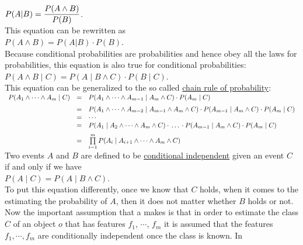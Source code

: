 $\displaystyle P(A|B) = \frac{P(A \wedge B)}{P(B)}$.
\\[0.2cm]
This equation can be rewritten as
\\[0.2cm]
\hspace*{1.3cm}
$P(A \wedge B) = P(A|B) \cdot P(B)$.
\\[0.2cm]
Because conditional probabilities are probabilities and hence obey all the laws for probabilities, this
equation is also true for conditional probabilities: 
\\[0.2cm]
\hspace*{1.3cm}
$P(A \wedge B\;|\;C) = P(A\;|\;B \wedge C) \cdot P(B\;|\;C)$.
\\[0.2cm]
This equation can be generalized to the so called \href{https://en.wikipedia.org/wiki/Chain_rule_(probability)}{chain rule of probability}:
\\[0.2cm]
\hspace*{1.2cm}
$
\begin{array}[t]{lcl}
       P(A_1 \wedge \cdots \wedge A_m \;|\;C) 
 & = & P(A_1 \wedge  \cdots \wedge A_{m-1}\;|\;A_{m} \wedge C) \cdot P(A_{m}\;|\;C) \\[0.2cm]
 & = & P(A_1 \wedge  \cdots \wedge A_{m-2}\;|\;A_{m-1} \wedge A_{m} \wedge C) \cdot P(A_{m-1} \;|\;A_m \wedge C)\cdot P(A_{m}\;|\;C) \\
 & = & \cdots \\
 & = &  P(A_1 \;|\; A_2 \wedge  \cdots \wedge A_{m} \wedge C) \cdot \,\dots\, \cdot P(A_{m-1} \;|\;A_m \wedge C)\cdot P(A_{m}\;|\;C) \\[0.2cm]
 & = & \prod\limits_{i=1}^m P(A_i \;|\; A_{i+1} \wedge  \cdots \wedge A_{m} \wedge C) 
\end{array}
$
\\[0.2cm]
Two events $A$ and $B$ are defined to be \href{https://en.wikipedia.org/wiki/Conditional_independence}{conditional independent}
given an event $C$ if and only if we have
\\[0.2cm]
\hspace*{1.3cm}
$P(A \;|\; C) = P(A \;|\; B \wedge C)$.
\\[0.2cm]
To put this equation differently, once we know that $C$ holds, when it comes to the estimating the probability of $A$,
then it does not matter whether $B$ holds or not.  Now the important assumption that a  
makes is that in order to estimate the class $C$ of an object $o$ that has features $f_1$, $\cdots$, $f_m$ it
is assumed that the features $f_1, \cdots, f_m$ are conditionally independent once the class is known.  In

